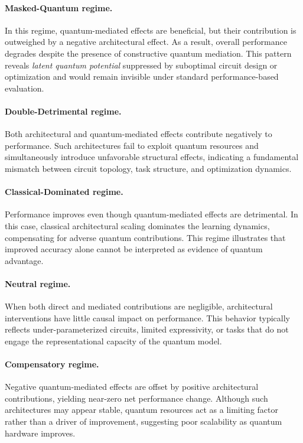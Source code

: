 \documentclass[
    reprint,
    amsmath, amssymb,
    aps,
    floatfix,
    nofootinbib
]{revtex4-1}
\begin{document}
\paragraph{Masked-Quantum regime.}
In this regime, quantum-mediated effects are beneficial, but their contribution is outweighed by a negative architectural effect. As a result, overall performance degrades despite the presence of constructive quantum mediation. This pattern reveals \emph{latent quantum potential} suppressed by suboptimal circuit design or optimization and would remain invisible under standard performance-based evaluation.

\paragraph{Double-Detrimental regime.}
Both architectural and quantum-mediated effects contribute negatively to performance. Such architectures fail to exploit quantum resources and simultaneously introduce unfavorable structural effects, indicating a fundamental mismatch between circuit topology, task structure, and optimization dynamics.

\paragraph{Classical-Dominated regime.}
Performance improves even though quantum-mediated effects are detrimental. In this case, classical architectural scaling dominates the learning dynamics, compensating for adverse quantum contributions. This regime illustrates that improved accuracy alone cannot be interpreted as evidence of quantum advantage.

\paragraph{Neutral regime.}
When both direct and mediated contributions are negligible, architectural interventions have little causal impact on performance. This behavior typically reflects under-parameterized circuits, limited expressivity, or tasks that do not engage the representational capacity of the quantum model.

\paragraph{Compensatory regime.}
Negative quantum-mediated effects are offset by positive architectural contributions, yielding near-zero net performance change. Although such architectures may appear stable, quantum resources act as a limiting factor rather than a driver of improvement, suggesting poor scalability as quantum hardware improves.
\end{document}
